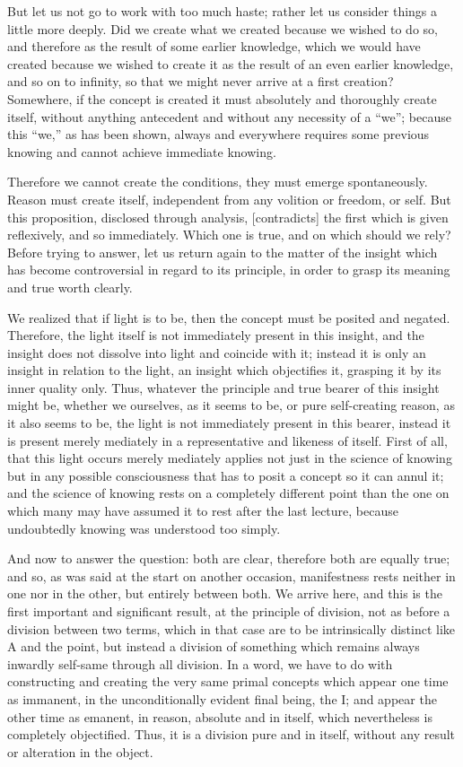 But let us not go to work with too much haste;
rather let us consider things a little more deeply.
Did we create what we created because we wished to do so,
and therefore as the result of some earlier knowledge,
which we would have created because we wished to create it
as the result of an even earlier knowledge, and so on to infinity,
so that we might never arrive at a first creation?
Somewhere, if the concept is created it must
absolutely and thoroughly create itself,
without anything antecedent
and without any necessity of a “we”;
because this “we,” as has been shown,
always and everywhere requires some previous knowing
and cannot achieve immediate knowing.

Therefore we cannot create the conditions,
they must emerge spontaneously.
Reason must create itself,
independent from any volition or freedom, or self.
But this proposition, disclosed through analysis,
[contradicts] the first which is given reflexively,
and so immediately.
Which one is true, and on which should we rely?
Before trying to answer, let us return again to the matter of the insight
which has become controversial in regard to its principle,
in order to grasp its meaning and true worth clearly.

We realized that if light is to be,
then the concept must be posited and negated.
Therefore, the light itself is not immediately present in this insight,
and the insight does not dissolve into light and coincide with it;
instead it is only an insight in relation to the light,
an insight which objectifies it,
grasping it by its inner quality only.
Thus, whatever the principle and true bearer of this insight might be,
whether we ourselves, as it seems to be,
or pure self-creating reason, as it also seems to be,
the light is not immediately present in this bearer,
instead it is present merely mediately in
a representative and likeness of itself.
First of all, that this light occurs merely mediately applies not
just in the science of knowing but in any possible consciousness
that has to posit a concept so it can annul it;
and the science of knowing rests on
a completely different point
than the one on which
many may have assumed it to rest after the last lecture,
because undoubtedly knowing was understood too simply.

And now to answer the question:
both are clear, therefore both are equally true;
and so, as was said at the start on another occasion,
manifestness rests neither in one nor in the other,
but entirely between both.
We arrive here, and this is the first important and significant result,
at the principle of division,
not as before a division between two terms,
which in that case are to be intrinsically distinct
like A and the point,
but instead a division of something
which remains always inwardly self-same through all division.
In a word, we have to do with constructing and creating
the very same primal concepts which appear one time as immanent,
in the unconditionally evident final being, the I;
and appear the other time as emanent,
in reason, absolute and in itself,
which nevertheless is completely objectified.
Thus, it is a division pure and in itself,
without any result or alteration in the object.

